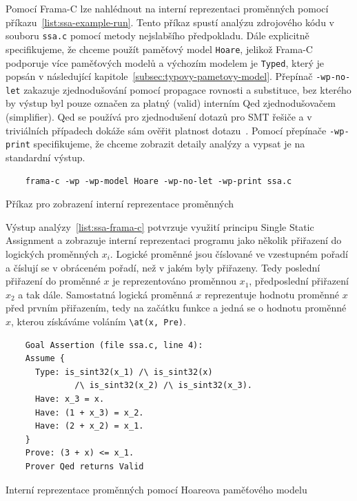 Pomocí Frama\mbox{-}C lze nahlédnout na interní reprezentaci proměnných pomocí příkazu~\ref{list:ssa-example-run}.
Tento příkaz spustí analýzu zdrojového kódu v souboru \texttt{ssa.c} pomocí metody nejslabšího předpokladu.
Dále explicitně specifikujeme, že chceme použít paměťový model \texttt{Hoare},
jelikož Frama\mbox{-}C podporuje více paměťových modelů a výchozím modelem je \texttt{Typed},
který je popsán v následující kapitole~\ref{subsec:typovy-pametovy-model}.
Přepínač \texttt{-wp-no-let} zakazuje zjednodušování pomocí propagace rovnosti a substituce,
bez kterého by výstup byl pouze označen za platný (valid) interním Qed zjednodušovačem (simplifier).
Qed se používá pro zjednodušení dotazů pro SMT řešiče a v triviálních případech dokáže sám ověřit platnost dotazu~\cite{WPManual, BlanchardWP2024}.
Pomocí přepínače \texttt{-wp-print} specifikujeme, že chceme zobrazit detaily analýzy a vypsat je na standardní výstup.

\begin{listing}[H]
    \begin{verbatim}
    frama-c -wp -wp-model Hoare -wp-no-let -wp-print ssa.c
    \end{verbatim}
    \caption{Příkaz pro zobrazení interní reprezentace proměnných}
    \label{list:ssa-example-run}
\end{listing}

Výstup analýzy~\ref{list:ssa-frama-c} potvrzuje využití principu Single Static Assignment
a zobrazuje interní reprezentaci programu jako několik přiřazení do logických proměnných $x_i$.
Logické proměnné jsou číslované ve vzestupném pořadí a číslují se v obráceném pořadí, než v jakém byly přiřazeny.
Tedy poslední přiřazení do proměnné $x$ je reprezentováno proměnnou $x_1$, předposlední přiřazení $x_2$ a tak dále.
Samostatná logická proměnná $x$ reprezentuje hodnotu proměnné $x$ před prvním přiřazením,
tedy na začátku funkce a jedná se o hodnotu proměnné $x$, kterou získáváme voláním \texttt{\textbackslash at(x, Pre)}.

\begin{listing}[H]
    \begin{verbatim}
    Goal Assertion (file ssa.c, line 4):
    Assume {
      Type: is_sint32(x_1) /\ is_sint32(x)
              /\ is_sint32(x_2) /\ is_sint32(x_3).
      Have: x_3 = x.
      Have: (1 + x_3) = x_2.
      Have: (2 + x_2) = x_1.
    }
    Prove: (3 + x) <= x_1.
    Prover Qed returns Valid
    \end{verbatim}
    \caption{Interní reprezentace proměnných pomocí Hoareova paměťového modelu}
    \label{list:ssa-frama-c}
\end{listing}

